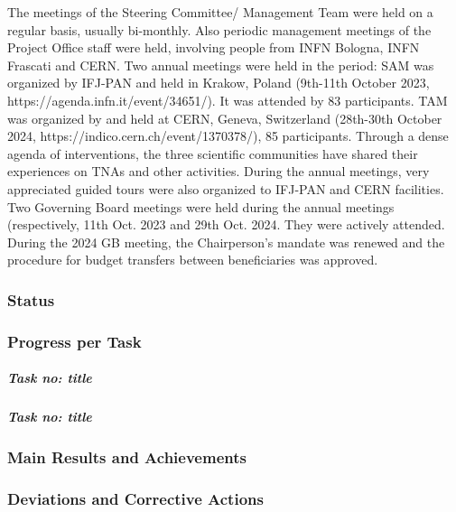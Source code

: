 The meetings of the Steering Committee/ Management Team were held on a regular basis, usually bi-monthly.
Also periodic management meetings of the Project Office staff were held, involving people from INFN Bologna, INFN Frascati and CERN.
Two annual meetings were held in the period: 
SAM was organized by IFJ-PAN and held in Krakow, Poland (9th-11th October 2023, https://agenda.infn.it/event/34651/). It was attended by 83 participants.
TAM was organized by and held at CERN, Geneva, Switzerland (28th-30th October 2024, https://indico.cern.ch/event/1370378/), 85 participants.
Through a dense agenda of interventions, the three scientific communities have shared their experiences on TNAs and other activities. During the annual meetings, very appreciated guided tours were also organized to IFJ-PAN and CERN facilities. 
Two Governing Board meetings were held during the annual meetings (respectively, 11th Oct. 2023 and 29th Oct. 2024. They were actively attended. During the 2024 GB meeting, the Chairperson's mandate was renewed and the procedure for budget transfers between beneficiaries was approved.


\subsubsection*{Status}


\subsubsection*{Progress per Task}

\subparagraph{Task no: title} \mbox{}


\subparagraph{Task no: title} \mbox{}


\subsubsection*{Main Results and Achievements}


\subsubsection*{Deviations and Corrective Actions}

